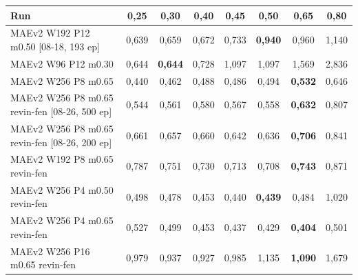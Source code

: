 \begin{tabular}{lccccccc}
\toprule
Run & 0,25 & 0,30 & 0,40 & 0,45 & 0,50 & 0,65 & 0,80 \\
\midrule
MAEv2 W192 P12 m0.50 [08-18, 193 ep] & 0,639 & 0,659 & 0,672 & 0,733 & \textbf{0,940} & 0,960 & 1,140 \\
MAEv2 W96 P12 m0.30 & 0,644 & \textbf{0,644} & 0,728 & 1,097 & 1,097 & 1,569 & 2,836 \\
MAEv2 W256 P8 m0.65 & 0,440 & 0,462 & 0,488 & 0,486 & 0,494 & \textbf{0,532} & 0,646 \\
MAEv2 W256 P8 m0.65 revin-fen [08-26, 500 ep] & 0,544 & 0,561 & 0,580 & 0,567 & 0,558 & \textbf{0,632} & 0,807 \\
MAEv2 W256 P8 m0.65 revin-fen [08-26, 200 ep] & 0,661 & 0,657 & 0,660 & 0,642 & 0,636 & \textbf{0,706} & 0,841 \\
MAEv2 W192 P8 m0.65 revin-fen & 0,787 & 0,751 & 0,730 & 0,713 & 0,708 & \textbf{0,743} & 0,871 \\
MAEv2 W256 P4 m0.50 revin-fen & 0,498 & 0,478 & 0,453 & 0,440 & \textbf{0,439} & 0,484 & 1,020 \\
MAEv2 W256 P4 m0.65 revin-fen & 0,527 & 0,499 & 0,453 & 0,437 & 0,429 & \textbf{0,404} & 0,501 \\
MAEv2 W256 P16 m0.65 revin-fen & 0,979 & 0,937 & 0,927 & 0,985 & 1,135 & \textbf{1,090} & 1,679 \\
\bottomrule
\end{tabular}
